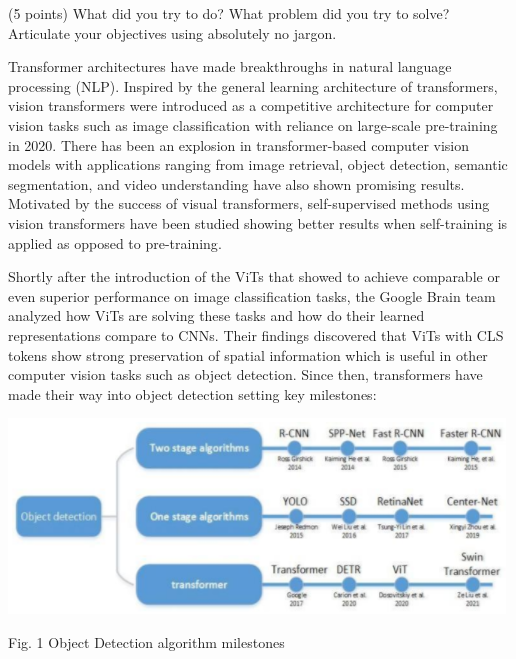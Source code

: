 \documentclass[10pt,twocolumn,letterpaper]{article}
\begin{document}
(5 points) What did you try to do? What problem did you try to solve? Articulate your objectives using absolutely no jargon.

Transformer architectures\cite{vaswani2017attention} have made breakthroughs in natural language processing (NLP). Inspired by the general learning architecture of transformers, vision transformers were introduced as a competitive architecture for computer vision tasks such as image classification\cite{dosovitskiy2020image} with reliance on large-scale pre-training in 2020. There has been an explosion in transformer-based computer vision models with applications ranging from image retrieval\cite{el2021training}, object detection\cite{liu2021swin}, semantic segmentation\cite{wang2021pyramid}\cite{zhang2021multi}\cite{https://doi.org/10.48550/arxiv.2012.15840}, and video understanding\cite{https://doi.org/10.48550/arxiv.2103.15691}\cite{bertasius2021space}\cite{https://doi.org/10.48550/arxiv.2104.11227} have also shown promising results. Motivated by the success of visual transformers, self-supervised methods using vision transformers have been studied showing better results when self-training is applied as opposed to pre-training\cite{zoph2020rethinking}\cite{https://doi.org/10.48550/arxiv.2104.14294}.

Shortly after the introduction of the ViTs that showed to achieve comparable or even superior performance on image classification tasks, the Google Brain team analyzed how ViTs are solving these tasks and how do their learned representations compare to CNNs\cite{raghu2021vision}. Their findings discovered that ViTs with CLS tokens show strong preservation of spatial information which is useful in other computer vision tasks such as object detection. Since then, transformers have made their way into object detection setting key milestones\cite{arkin2021survey}:

\includegraphics[width=0.8\linewidth]{docs/latex/images/ObjectDetection.png}
\caption{Fig. 1 Object Detection algorithm milestones}
\end{document}
